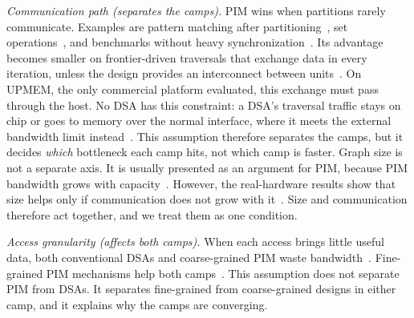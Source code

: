 \documentclass[journal,onecolumn]{IEEEtran}
\begin{document}
\emph{Communication path (separates the camps).} PIM wins when partitions rarely communicate. Examples are pattern matching after partitioning~\cite{cai2024pimpam}, set operations~\cite{besta2021sisa}, and benchmarks without heavy synchronization~\cite{gomezluna2022prim}. Its advantage becomes smaller on frontier-driven traversals that exchange data in every iteration, unless the design provides an interconnect between units~\cite{zhuo2019graphq,barkhordar2025alphapim}. On UPMEM, the only commercial platform evaluated, this exchange must pass through the host. No DSA has this constraint: a DSA's traversal traffic stays on chip or goes to memory over the normal interface, where it meets the external bandwidth limit instead~\cite{orenesvera2023dalorex}. This assumption therefore separates the camps, but it decides \emph{which} bottleneck each camp hits, not which camp is faster. Graph size is not a separate axis. It is usually presented as an argument for PIM, because PIM bandwidth grows with capacity~\cite{ahn2015tesseract,zhuo2019graphq}. However, the real-hardware results show that size helps only if communication does not grow with it~\cite{gomezluna2022prim}. Size and communication therefore act together, and we treat them as one condition.

\emph{Access granularity (affects both camps).} When each access brings little useful data, both conventional DSAs and coarse-grained PIM waste bandwidth~\cite{shin2025piccolo}. Fine-grained PIM mechanisms help both camps~\cite{shin2025fala,yenimol2026cograf}. This assumption does not separate PIM from DSAs. It separates fine-grained from coarse-grained designs in either camp, and it explains why the camps are converging.
\end{document}
